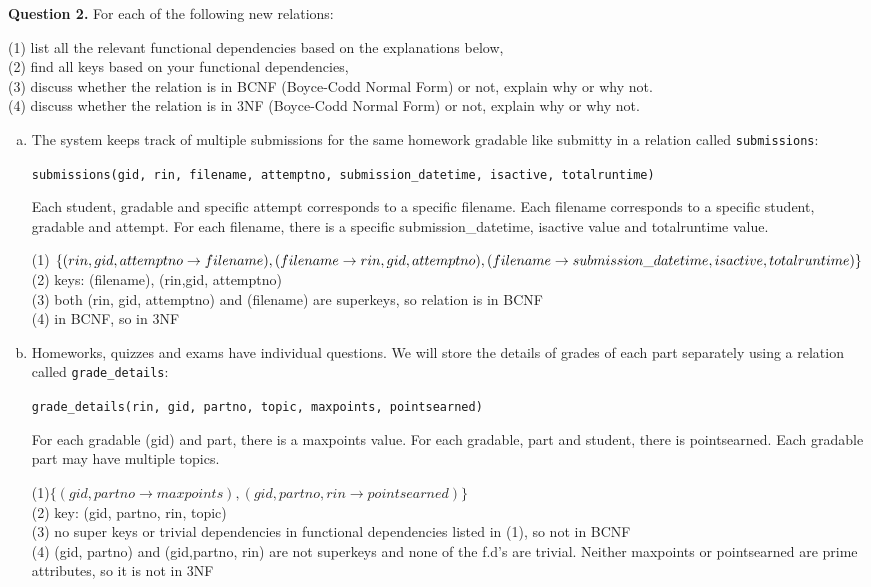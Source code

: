 \documentclass[11pt]{article}
\begin{document}
\newpage

{\bf Question 2.} For each of the following new relations:

(1) list all the relevant functional dependencies based on the explanations below, \\
(2) find all keys based on your functional dependencies, \\
(3) discuss whether the relation is in BCNF (Boyce-Codd Normal Form) or not, explain why or why not. \\
(4) discuss whether the relation is in 3NF (Boyce-Codd Normal Form) or not, explain why or why not.

\begin{enumerate} [(a)]

  \item The system keeps track of multiple submissions for the same
  homework gradable like submitty in a relation called {\tt submissions}: 

  {\tt submissions(gid, rin, filename, attemptno, submission\_datetime, isactive, totalruntime)} 

  Each student, gradable and specific attempt corresponds to a
  specific filename. Each filename corresponds to a specific student,
  gradable and attempt. For each filename, there is a specific
  submission\_datetime, isactive value and totalruntime value.
\medskip

(1) $\{ (rin,gid,attemptno\rightarrow filename), (filename \rightarrow rin,gid,attemptno), \\
(filename\rightarrow submission\_datetime,isactive, totalruntime) \}$ \\
(2) keys: (filename), (rin,gid, attemptno)\\ 
(3) both (rin, gid, attemptno) and (filename) are superkeys, so relation is in BCNF \\
(4) in BCNF, so in 3NF


\item Homeworks, quizzes and exams have individual questions. We will
  store the details of grades of each part separately using a
  relation called {\tt grade\_details}:

  {\tt grade\_details(rin, gid, partno, topic, maxpoints, pointsearned)}

  For each gradable (gid) and part, there is a maxpoints value. For
  each gradable, part and student, there is pointsearned. Each
  gradable part may have multiple topics.
\medskip

(1)$\{ (gid,partno\rightarrow maxpoints), (gid,partno,rin \rightarrow pointsearned) \}$ \\
(2) key: (gid, partno, rin, topic) \\
(3) no super keys or trivial dependencies in functional dependencies listed in (1), so not in BCNF \\ 
(4) (gid, partno) and (gid,partno, rin) are not superkeys and none of the f.d's are trivial. Neither maxpoints or pointsearned are prime attributes, so it is not in 3NF

\end{enumerate}
\end{document}
